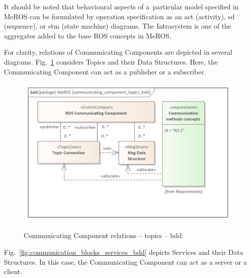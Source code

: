 \documentclass[11pt,oneside,a4paper]{article}
\begin{document}
	It should be noted that behavioural aspects of a~particular model specified in MeROS can be formulated by operation specification as an act (activity), sd (sequence), or stm (state machine) diagrams. The Intrasystem is one of the aggregates added to the base ROS concepts in MeROS. 
	
	\pagebreak
	
	For clarity, relations of Communicating Components are depicted in several diagrams. Fig.~\ref{fig:communicating_component_topics_bdd} considers Topics and their Data Structures. Here, the Communicating Component can act as a publisher or a subscriber.	
	 
	\begin{figure}[H]
		\centering
		\begin{center}
			{\includegraphics[scale=1.0]{img/meros_pkg/communicating_component_topics_bdd.png}}
		\end{center}
		\caption{Communicating Component relations -- topics -- bdd.} 
		\label{fig:communicating_component_topics_bdd}
	\end{figure}
	
	Fig.~\ref{fig:communication_blocks_services_bdd} depicts Services and their Data Structures. In this case, the Communicating Component can act as a server or a client.	
	
\end{document}
